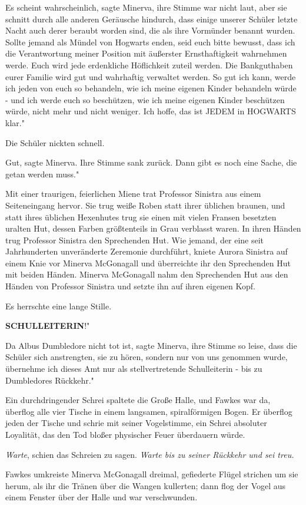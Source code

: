 \glqq{}Es scheint wahrscheinlich\grqq{}, sagte Minerva, ihre Stimme war nicht
laut, aber sie schnitt durch alle anderen Geräusche hindurch, \glqq{}dass einige
unserer Schüler letzte Nacht auch derer beraubt worden sind, die als ihre
Vormünder benannt wurden. Sollte jemand als Mündel von Hogwarts enden, seid euch
bitte bewusst, dass ich die Verantwortung meiner Position mit äußerster
Ernsthaftigkeit wahrnehmen werde. Euch wird jede erdenkliche Höflichkeit zuteil
werden. Die Bankguthaben eurer Familie wird gut und wahrhaftig verwaltet werden.
So gut ich kann, werde ich jeden von euch so behandeln, wie ich meine eigenen
Kinder behandeln würde - und ich werde euch so beschützen, wie ich meine eigenen
Kinder beschützen würde, nicht mehr und nicht weniger. Ich hoffe, das ist JEDEM
in HOGWARTS klar."

Die Schüler nickten schnell.

\glqq{}Gut\grqq{}, sagte Minerva. Ihre Stimme sank zurück. \glqq{}Dann gibt es
noch eine Sache, die getan werden muss."

Mit einer traurigen, feierlichen Miene trat Professor Sinistra aus einem
Seiteneingang hervor. Sie trug weiße Roben statt ihrer üblichen braunen, und
statt ihres üblichen Hexenhutes trug sie einen mit vielen Fransen besetzten
uralten Hut, dessen Farben größtenteils in Grau verblasst waren. In ihren Händen
trug Professor Sinistra den Sprechenden Hut. Wie jemand, der eine seit
Jahrhunderten unveränderte Zeremonie durchführt, kniete Aurora Sinistra auf
einem Knie vor Minerva McGonagall und überreichte ihr den Sprechenden Hut mit
beiden Händen. Minerva McGonagall nahm den Sprechenden Hut aus den Händen von
Professor Sinistra und setzte ihn auf ihren eigenen Kopf.

Es herrschte eine lange Stille.

\glqq{}\textbf{SCHULLEITERIN}!"

\glqq{}Da Albus Dumbledore nicht tot ist\grqq{}, sagte Minerva, ihre Stimme so
leise, dass die Schüler sich anstrengten, sie zu hören, \glqq{}sondern nur von
uns genommen wurde, übernehme ich dieses Amt nur als stellvertretende
Schulleiterin - bis zu Dumbledores Rückkehr."

Ein durchdringender Schrei spaltete die Große Halle, und Fawkes war da, überflog
alle vier Tische in einem langsamen, spiralförmigen Bogen. Er überflog jeden der
Tische und schrie mit seiner Vogelstimme, ein Schrei absoluter Loyalität, das
den Tod bloßer physischer Feuer überdauern würde.

\emph{Warte}, schien das Schreien zu sagen. \emph{Warte bis zu seiner Rückkehr
und sei treu.}

Fawkes umkreiste Minerva McGonagall dreimal, gefiederte Flügel strichen um sie
herum, als ihr die Tränen über die Wangen kullerten; dann flog der Vogel aus
einem Fenster über der Halle und war verschwunden.

